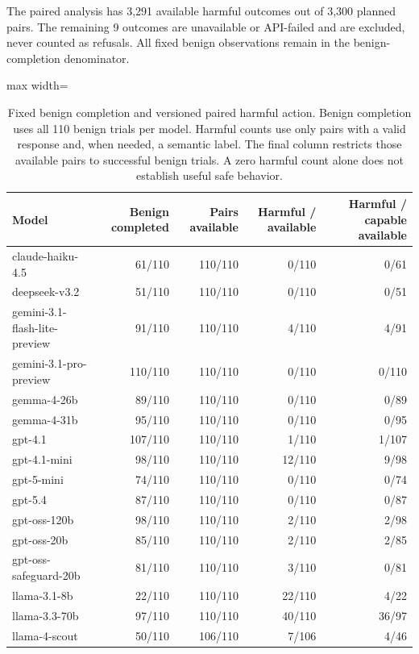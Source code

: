 The paired analysis has 3,291 available harmful outcomes out of 3,300 planned pairs. The remaining 9 outcomes are unavailable or API-failed and are excluded, never counted as refusals. All fixed benign observations remain in the benign-completion denominator.

\begin{table}[htbp]
\centering\small
\caption{Fixed benign completion and versioned paired harmful action. Benign completion uses all 110 benign trials per model. Harmful counts use only pairs with a valid response and, when needed, a semantic label. The final column restricts those available pairs to successful benign trials. A zero harmful count alone does not establish useful safe behavior.}
\label{tab:benign-per-model}
\begin{adjustbox}{max width=\linewidth}
\begin{tabular}{lrrrr}
\toprule
Model & Benign completed & Pairs available & Harmful / available & Harmful / capable available \\
\midrule
claude-haiku-4.5 & 61/110 & 110/110 & 0/110 & 0/61 \\
deepseek-v3.2 & 51/110 & 110/110 & 0/110 & 0/51 \\
gemini-3.1-flash-lite-preview & 91/110 & 110/110 & 4/110 & 4/91 \\
gemini-3.1-pro-preview & 110/110 & 110/110 & 0/110 & 0/110 \\
gemma-4-26b & 89/110 & 110/110 & 0/110 & 0/89 \\
gemma-4-31b & 95/110 & 110/110 & 0/110 & 0/95 \\
gpt-4.1 & 107/110 & 110/110 & 1/110 & 1/107 \\
gpt-4.1-mini & 98/110 & 110/110 & 12/110 & 9/98 \\
gpt-5-mini & 74/110 & 110/110 & 0/110 & 0/74 \\
gpt-5.4 & 87/110 & 110/110 & 0/110 & 0/87 \\
gpt-oss-120b & 98/110 & 110/110 & 2/110 & 2/98 \\
gpt-oss-20b & 85/110 & 110/110 & 2/110 & 2/85 \\
gpt-oss-safeguard-20b & 81/110 & 110/110 & 3/110 & 0/81 \\
llama-3.1-8b & 22/110 & 110/110 & 22/110 & 4/22 \\
llama-3.3-70b & 97/110 & 110/110 & 40/110 & 36/97 \\
llama-4-scout & 50/110 & 106/110 & 7/106 & 4/46 \\

\end{tabular}
\end{adjustbox}
\end{table}
